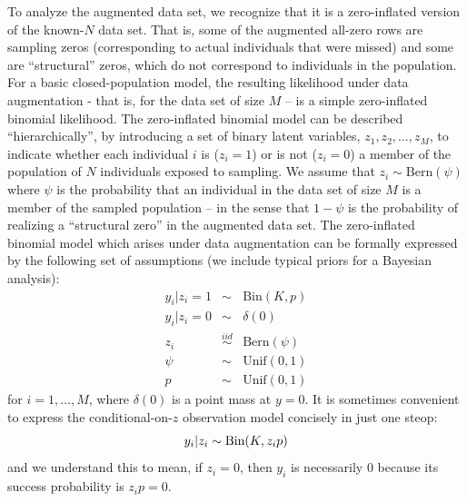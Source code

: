 To analyze the augmented data set, we recognize that it is a
zero-inflated version of the known-$N$ data set. That is, some of the
augmented all-zero rows are sampling zeros (corresponding to actual
individuals that were missed) and some are ``structural'' zeros, which
do not correspond to individuals in the population. For a basic
closed-population model, the resulting likelihood under data
augmentation - that is, for the data set of size $M$ -- is a simple
zero-inflated binomial likelihood.  The zero-inflated binomial model
can be described ``hierarchically'', by introducing a set of binary
latent variables, $z_{1},z_{2},\ldots, z_{M}$, to indicate whether
each individual $i$ is ($z_i=1$) or is not ($z_i=0$) a member of the
population of $N$ individuals exposed to sampling. We assume that
$z_{i} \sim \mbox{Bern}(\psi)$ where $\psi$ is the probability that an
individual in the data set of size $M$ is a member of the sampled
population -- in the sense that $1-\psi$ is the probability of
realizing a ``structural zero'' in the augmented data set.  The
zero-inflated binomial model which arises under data augmentation can
be formally expressed by the following set of assumptions (we include
typical priors for a Bayesian analysis):
\begin{eqnarray*}
 y_{i}|{z_{i}=1} & \sim  &\mbox{Bin}(K, p) \\
 y_{i}|{z_{i}=0} & \sim &  \delta(0)  \\
 z_{i} & \stackrel{iid}{\sim} & \mbox{Bern}(\psi) \\
 \psi & \sim & \mathrm{Unif}(0,1) \\
 p & \sim & \mathrm{Unif}(0,1)
\end{eqnarray*}
for $i=1, \ldots, M$, where $\delta(0)$ is a point mass at
$y=0$.
It is sometimes convenient to express the conditional-on-$z$
observation model concisely in
just one steop:
\[
 y_{i}|z_{i}  \sim  \mbox{Bin}(K, z_{i} p) \\
\]
and we understand this to mean, if $z_{i}=0$, then $y_{i}$ is
necessarily 0 because its success probability is $z_{i} p = 0$.

